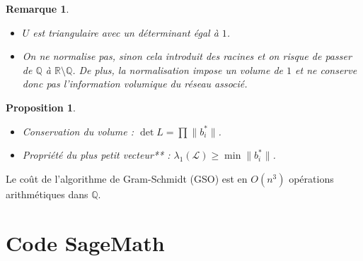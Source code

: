 \documentclass[a4paper,12pt]{report}  %
\theoremstyle{definitionstyle}
\theoremstyle{examplestyle}
\theoremstyle{remarkstyle}
\newtheorem{remark}{Remarque}[chapter] %
\theoremstyle{propositionstyle}
\newtheorem{proposition}{Proposition}[chapter]  %
\begin{document}
	 \begin{remark}
	 	\begin{itemize}
	 		\item  $U$ est triangulaire avec un déterminant égal à $1$.
	 		\item On ne normalise pas, sinon cela introduit des racines et on risque de passer de \( \mathbb{Q} \) à \( \mathbb{R} \setminus \mathbb{Q} \). De plus, la normalisation impose un volume de $1$ et ne conserve donc pas l'information volumique du réseau associé.
	 	\end{itemize}
 	\end{remark}
	
	
	\begin{proposition}
		\begin{itemize}
			\item Conservation du volume : \( \det L = \prod \| b_i^* \| \).
			\item Propriété du plus petit vecteur** : \( \lambda_1(\mathcal{L}) \geq \min \| b_i^* \| \).
		\end{itemize}
	\end{proposition}	
	
	Le coût de l'algorithme de Gram-Schmidt (GSO) est en \( O(n^3) \) opérations arithmétiques dans \( \mathbb{Q} \).
	
	\chapter{Code SageMath}

	
	\printbibliography
	
\end{document}
